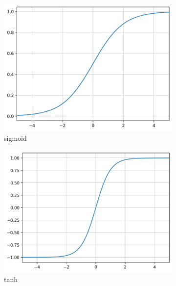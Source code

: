  \begin{figure}[htpb]
  \centering
  \begin{subfigure}[b]{0.29\textwidth}
    \includegraphics[width=\textwidth]{./ch4-asr/img/sigmoid.png}
    \caption{sigmoid}
    \label{fig:asr:acoustic:dnn:activation:sigmoid}
  \end{subfigure}
  \begin{subfigure}[b]{0.3\textwidth}
    \includegraphics[width=\textwidth]{./ch4-asr/img/tanh.png}
    \caption{tanh}
    \label{fig:asr:acoustic:dnn:activation:tanh}
  \end{subfigure}
  \begin{subfigure}[b]{0.28\textwidth}

\end{subfigure}
\end{figure}
